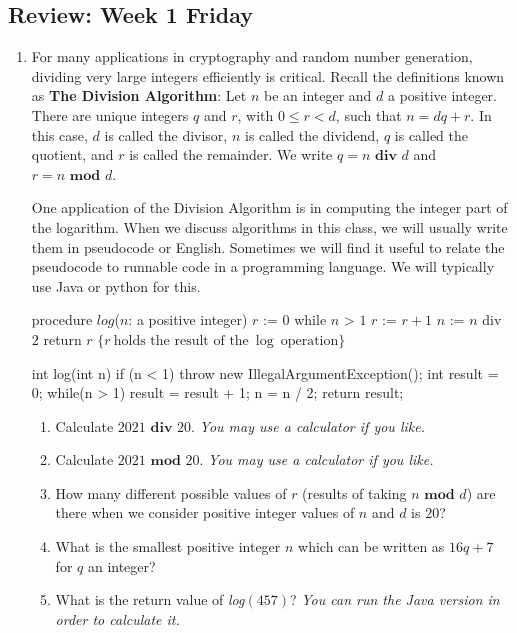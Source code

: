 \documentclass[12pt, oneside]{article}
\begin{document}
\vfill
\vfill \newpage
\subsection*{Review: Week 1 Friday}
\begin{enumerate}
    \item {

For many applications in cryptography and random number generation,
dividing very large integers efficiently is critical.  Recall the definitions
known as {\bf The Division Algorithm}:
Let $n$ be an integer 
and $d$ a positive integer. There are unique integers $q$ and $r$, with $0 \leq r < d$, such that 
$n = dq + r$. In this case, $d$ is called the divisor, $n$ is called the dividend, $q$ is called the quotient, 
and $r$ is called the remainder. We write $q=n \textbf{ div } d$ and $r=n \textbf{ mod } d$.

One application of the Division Algorithm is in computing the integer part of the logarithm.
When we discuss algorithms in this class, we will usually write them in 
pseudocode or English. Sometimes we will find it useful to relate the pseudocode to
runnable code in a programming language. We will typically use Java or python for this.

\begin{multicols}{2}
\begin{algorithm}[caption={Calculating log in pseudocode}]
procedure $\textit{log}$($n$: a positive integer)
$r$ := $0$
while $n$ > $1$
  $r$ := $r + 1$
  $n$ := $n$ div $2$
return $r$ $\{ r~\textrm{holds the result of the}~\log~\textrm{operation}\} $
\end{algorithm}
\columnbreak
\begin{java}[caption={Calculating log in Java}]
int log(int n) {
  if (n < 1) { 
    throw new IllegalArgumentException(); 
  }
  int result = 0;
  while(n > 1) {
    result = result + 1;
    n = n / 2;
  }
  return result;
}
\end{java}
\end{multicols}


\begin{enumerate}
\item Calculate $2021 \textbf{ div } 20$.  {\it You may use a calculator if you like.}
\item Calculate $2021 \textbf{ mod } 20$.  {\it You may use a calculator if you like.}
\item How many different possible values of $r$ (results of taking $n \textbf{ mod } d$) are there when 
we consider positive integer values of $n$ and $d$ is $20$?
\item What is the smallest positive integer $n$ which can be written as $16q+7$ for $q$ an integer?
\item What is the return value of \textit{log$(457)$}?
{\it You can run the Java version in order to calculate it.}
\end{enumerate}

}
\end{enumerate}
\end{document}
